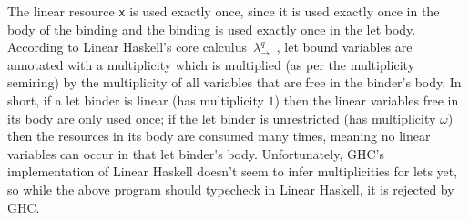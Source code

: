 \documentclass[acmsmall,review]{acmart}
\newcommand{\lolli}{\multimap}
\begin{document}




%
The linear resource \lstinline{x} is used exactly once, since it is used exactly once in
the body of the binding and the binding is used exactly once in the let body.
%
According to Linear Haskell's core calculus~$\lambda_{\to}^{q}$~\cite{cite:linearhaskell}, let
bound variables are annotated with a multiplicity which is multiplied (as per
the multiplicity semiring) by the multiplicity of all variables that are free
in the binder's body.
%
In short, if a let binder is linear (has
multiplicity $1$) then the linear variables free in its body are only used
once; if the let binder is unrestricted (has multiplicity $\omega$) then the
resources in its body are consumed many times, meaning no linear variables can
occur in that let binder's body.
%
Unfortunately, GHC's implementation of Linear
Haskell doesn't seem to infer multiplicities for lets yet, so while the above
program should typecheck in Linear Haskell, it is rejected by GHC.
\end{document}

